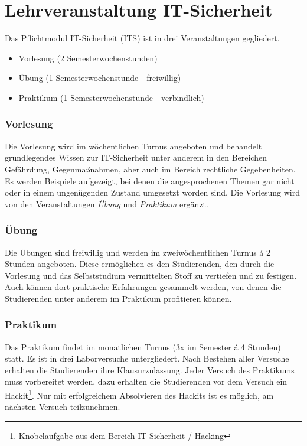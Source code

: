 \section{Lehrveranstaltung IT-Sicherheit} \label{sec:Lehrveranstaltung_IT-Sicherheit}

Das Pflichtmodul IT-Sicherheit (ITS) ist in drei Veranstaltungen gegliedert. \cite[S.30]{hochschuleniederrheinModulhandbuchVollzeitBA2019}
\begin{itemize}
	\item Vorlesung (2 Semesterwochenstunden)
	\item Übung (1 Semesterwochenstunde - freiwillig)
	\item Praktikum (1 Semesterwochenstunde - verbindlich)
\end{itemize}

\subsubsection{Vorlesung}
Die Vorlesung wird im wöchentlichen Turnus angeboten und behandelt grundlegendes Wissen zur IT-Sicherheit unter anderem in den Bereichen Gefährdung, Gegenmaßnahmen, aber auch im Bereich rechtliche Gegebenheiten. Es werden Beispiele aufgezeigt, bei denen die angesprochenen Themen gar nicht oder in einem ungenügenden Zustand umgesetzt worden sind. Die Vorlesung wird von den Veranstaltungen \textit{Übung} und \textit{Praktikum} ergänzt.

\subsubsection{Übung}
Die Übungen sind freiwillig und werden im zweiwöchentlichen Turnus á 2 Stunden angeboten. Diese ermöglichen es den Studierenden, den durch die Vorlesung und das Selbststudium vermittelten Stoff zu vertiefen und zu festigen. Auch können dort praktische Erfahrungen gesammelt werden, von denen die Studierenden unter anderem im Praktikum profitieren können.

\subsubsection{Praktikum}
Das Praktikum findet im monatlichen Turnus (3x im Semester á 4 Stunden) statt. Es ist in drei Laborversuche untergliedert. Nach Bestehen aller Versuche erhalten die Studierenden ihre Klausurzulassung. Jeder Versuch des Praktikums muss vorbereitet werden, dazu erhalten die Studierenden vor dem Versuch ein Hackit\footnote{Knobelaufgabe aus dem Bereich IT-Sicherheit / Hacking}. Nur mit erfolgreichem Absolvieren des Hackits ist es möglich, am nächsten Versuch teilzunehmen. \cite{quadePraktikumITSecurity2017}